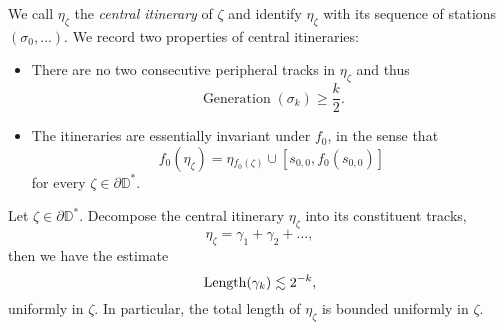 

We call $\eta_{\zeta}$ the \emph{central itinerary} of $\zeta$ and identify $\eta_{\zeta}$ with its sequence of stations $(\sigma_0,\ldots)$. We record two properties of central itineraries:

\begin{itemize}
	\item There are no two consecutive peripheral tracks in $\eta_{\zeta}$ and thus
	\begin{equation} \label{generation-lower-bound}
		\operatorname{Generation}(\sigma_k)\geq \frac k2.
	\end{equation}
	
	\item The itineraries are essentially invariant under $f_{0}$, in the sense that
	\begin{equation*}
		f_{0}(\eta_{\zeta})=\eta{}_{f_{0}(\zeta)}\cup[s_{0,0},f_0(s_{0,0})]
	\end{equation*}
	for every $\zeta\in \partial \mathbb D^*$.
	
\end{itemize}


\begin{lemma} \label{track_decay}
Let $\zeta\in \partial \mathbb D^*$. Decompose the central itinerary $\eta_{\zeta}$ into its constituent tracks, 
$$\eta_{\zeta}=\gamma _1 + \gamma_2 + \dots,$$ 
	then we have the estimate $$\operatorname{Length}(\gamma_{k})\lesssim 2^{-k},$$ uniformly in $\zeta$. 
In particular, the total length of $\eta_\zeta$ is bounded uniformly in $\zeta$.
\end{lemma}





